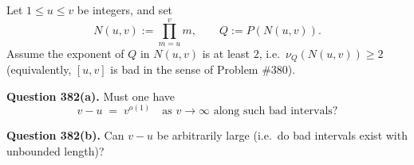 Let $1\le u\le v$ be integers, and set
\[
N(u,v):=\prod_{m=u}^{v} m,\qquad Q:=P(N(u,v)).
\]
Assume the exponent of $Q$ in $N(u,v)$ is at least $2$, i.e.\ $\nu_Q(N(u,v))\ge 2$ (equivalently, $[u,v]$ is bad in the sense of Problem \#380).

\noindent\textbf{Question 382(a).} Must one have
\[
v-u \;=\; v^{o(1)}\quad\text{as }v\to\infty\text{ along such bad intervals?}
\]

\noindent\textbf{Question 382(b).} Can $v-u$ be arbitrarily large (i.e.\ do bad intervals exist with unbounded length)?
